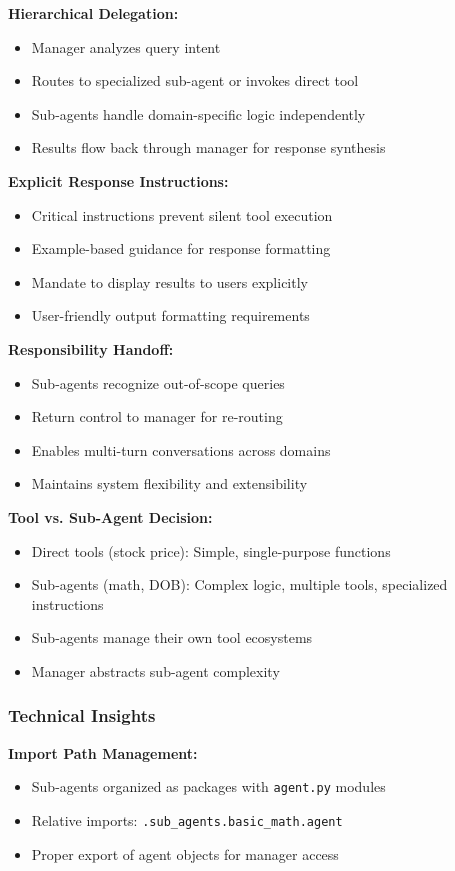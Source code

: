 \documentclass[12pt,a4paper]{article}
\begin{document}
\textbf{Hierarchical Delegation:}
\begin{itemize}
    \item Manager analyzes query intent
    \item Routes to specialized sub-agent or invokes direct tool
    \item Sub-agents handle domain-specific logic independently
    \item Results flow back through manager for response synthesis
\end{itemize}

\textbf{Explicit Response Instructions:}
\begin{itemize}
    \item Critical instructions prevent silent tool execution
    \item Example-based guidance for response formatting
    \item Mandate to display results to users explicitly
    \item User-friendly output formatting requirements
\end{itemize}

\textbf{Responsibility Handoff:}
\begin{itemize}
    \item Sub-agents recognize out-of-scope queries
    \item Return control to manager for re-routing
    \item Enables multi-turn conversations across domains
    \item Maintains system flexibility and extensibility
\end{itemize}

\textbf{Tool vs. Sub-Agent Decision:}
\begin{itemize}
    \item Direct tools (stock price): Simple, single-purpose functions
    \item Sub-agents (math, DOB): Complex logic, multiple tools, specialized instructions
    \item Sub-agents manage their own tool ecosystems
    \item Manager abstracts sub-agent complexity
\end{itemize}

\subsubsection{Technical Insights}

\textbf{Import Path Management:}
\begin{itemize}
    \item Sub-agents organized as packages with \texttt{agent.py} modules
    \item Relative imports: \texttt{.sub\_agents.basic\_math.agent}
    \item Proper export of agent objects for manager access
\end{itemize}
\end{document}
